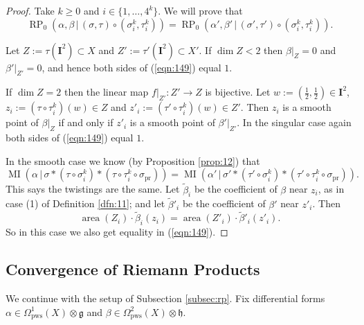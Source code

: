 \documentclass[10pt, a4paper]{amsart}
\theoremstyle{definition}
\numberwithin{equation}{section}
\newcommand{\opn}{\operatorname}
\newcommand{\mfrak}[1]{\mathfrak{#1}}
\newcommand{\mbf}[1]{\mathbf{#1}}
\newcommand{\mrm}[1]{\mathrm{#1}}
\newcommand{\smfrac}[2]{{\textstyle \frac{#1}{#2}}}
\newcommand{\til}[1]{\tilde{#1}}
\renewcommand{\vert}{\, | \,}
\newcommand{\g}{\mfrak{g}}
\newcommand{\h}{\mfrak{h}}
\begin{document}
\begin{proof}
Take $k \geq 0$ and $i \in \{ 1, \ldots, 4^k \}$.
We will prove that 
\begin{equation} \label{eqn:149}
 \opn{RP}_0(\alpha, \beta \vert (\sigma, \tau) \circ 
(\sigma^k_i, \tau^k_i)) = 
\opn{RP}_0(\alpha', \beta' \vert (\sigma', \tau') \circ 
(\sigma^k_i, \tau^k_i)) .
\end{equation}

Let $Z := \tau(\mbf{I}^2) \subset X$
and $Z' := \tau'(\mbf{I}^2) \subset X'$.
If $\opn{dim} Z < 2$ then 
$\beta|_{Z} = 0$ and $\beta'|_{Z'} = 0$, and hence both sides of
(\ref{eqn:149}) equal $1$. 

If $\opn{dim} Z = 2$ then the linear map 
$f|_{Z'} : Z' \to Z$ is bijective. Let
$w := (\smfrac{1}{2}, \smfrac{1}{2}) \in \mbf{I}^2$,
$z_i := (\tau \circ \tau^k_i)(w) \in Z$ and 
$z'_i := (\tau' \circ \tau^k_i)(w) \in Z'$.
Then $z_i$ is a smooth point of $\beta|_Z$ if and only if 
$z'_i$ is a smooth point of $\beta'|_{Z'}$. In the singular case again 
both sides of (\ref{eqn:149}) equal $1$. 

In the smooth case we know (by Proposition \ref{prop:12}) that
\[ \opn{MI}(\alpha \vert \sigma * (\tau \circ \sigma^k_i) *  
(\tau \circ \tau^k_i \circ \sigma_{\mrm{pr}})) = 
\opn{MI}(\alpha' \vert \sigma' * (\tau' \circ \sigma^k_i) *  
(\tau' \circ \tau^k_i \circ \sigma_{\mrm{pr}})) . \]
This says the twistings are the same. 
Let $\til{\beta}_i$ be the coefficient of $\beta$ near $z_i$, as in
case (1) of Definition \ref{dfn:11}; and let $\til{\beta}'_i$ be 
the coefficient of $\beta'$ near $z'_i$. Then
\[ \opn{area}(Z_i) \cdot \til{\beta}_i(z_i) =  
\opn{area}(Z'_i) \cdot \til{\beta}'_i(z'_i) . \]
So in this case we also get equality in (\ref{eqn:149}).
\end{proof}




\subsection{Convergence of Riemann Products}
We continue with the setup of Subsection \ref{subsec:rp}.
Fix differential forms
$\alpha \in \Omega^1_{\mrm{pws}}(X) \otimes \g$ and
$\beta \in \Omega^2_{\mrm{pws}}(X) \otimes \h$.
\end{document}
